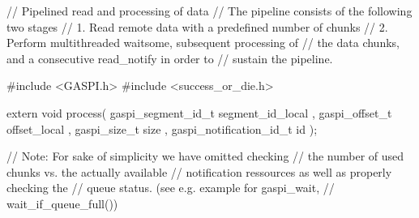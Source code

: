 // Pipelined read and processing of data 
// The pipeline consists of the following two stages
// 1. Read remote data with a predefined number of chunks
// 2. Perform multithreaded waitsome, subsequent processing of 
//    the data chunks, and a consecutive read_notify in order to 
//    sustain the pipeline. 
 
#include <GASPI.h>
#include <success_or_die.h>

extern void process( gaspi_segment_id_t segment_id_local
                   , gaspi_offset_t offset_local
                   , gaspi_size_t size
                   , gaspi_notification_id_t id
                   );

// Note: For sake of simplicity we have omitted checking 
//       the number of used chunks vs. the actually available 
//       notification ressources as well as properly checking the 
//       queue status. (see e.g. example for gaspi_wait, 
//       wait_if_queue_full()) 

